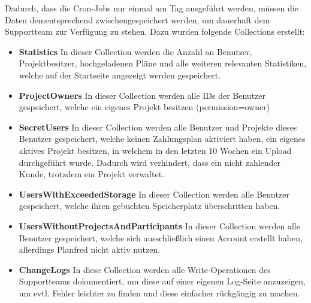 Dadurch, dass die Cron-Jobs nur einmal am Tag ausgeführt werden, müssen die Daten dementsprechend zwischengespeichert werden, um dauerhaft dem Supportteam zur Verfügung zu stehen. Dazu wurden folgende Collections erstellt:
\begin{itemize}
    \item \textbf{Statistics}
        \newline
        In dieser Collection werden die Anzahl an Benutzer, Projektbesitzer, hochgeladenen Pläne und alle weiteren relevanten Statistiken, welche auf der Startseite angezeigt werden gespeichert.
    \item \textbf{ProjectOwners}
        \newline
        In dieser Collection werden alle IDs der Benutzer gespeichert, welche ein eigenes Projekt besitzen (permission=owner)
    \item \textbf{SecretUsers}
        \newline
        In dieser Collection werden alle Benutzer und Projekte dieses Benutzer gespeichert, welche keinen Zahlungsplan aktiviert haben, ein eigenes aktives Projekt besitzen, in welchem in den letzten 10 Wochen ein Upload durchgeführt wurde. Dadurch wird verhindert, dass ein nicht zahlender Kunde, trotzdem ein Projekt verwaltet.
    \item \textbf{UsersWithExceededStorage}
        \newline
        In dieser Collection werden alle Benutzer gespeichert, welche ihren gebuchten Speicherplatz überschritten haben.
    \item \textbf{UsersWithoutProjectsAndParticipants}
        \newline
        In dieser Collection werden alle Benutzer gespeichert, welche sich ausschließlich einen Account erstellt haben, allerdings Planfred nicht aktiv nutzen.
    \item \textbf{ChangeLogs}
        \newline
        In diese Collection werden alle Write-Operationen des Supportteams dokumentiert, um diese auf einer eigenen Log-Seite anzuzeigen, um evtl. Fehler leichter zu finden und diese einfacher rückgängig zu machen.
\end{itemize}